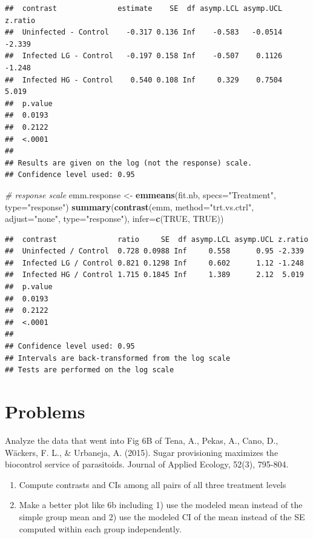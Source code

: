 \documentclass[]{book}
\newenvironment{Shaded}{\begin{snugshade}}{\end{snugshade}}
\newcommand{\KeywordTok}[1]{\textcolor[rgb]{0.13,0.29,0.53}{\textbf{#1}}}
\newcommand{\DataTypeTok}[1]{\textcolor[rgb]{0.13,0.29,0.53}{#1}}
\newcommand{\StringTok}[1]{\textcolor[rgb]{0.31,0.60,0.02}{#1}}
\newcommand{\CommentTok}[1]{\textcolor[rgb]{0.56,0.35,0.01}{\textit{#1}}}
\newcommand{\OtherTok}[1]{\textcolor[rgb]{0.56,0.35,0.01}{#1}}
\newcommand{\NormalTok}[1]{#1}
\providecommand{\tightlist}{%
  \setlength{\itemsep}{0pt}\setlength{\parskip}{0pt}}
\begin{document}
\begin{verbatim}
##  contrast              estimate    SE  df asymp.LCL asymp.UCL z.ratio
##  Uninfected - Control    -0.317 0.136 Inf    -0.583   -0.0514 -2.339 
##  Infected LG - Control   -0.197 0.158 Inf    -0.507    0.1126 -1.248 
##  Infected HG - Control    0.540 0.108 Inf     0.329    0.7504  5.019 
##  p.value
##  0.0193 
##  0.2122 
##  <.0001 
## 
## Results are given on the log (not the response) scale. 
## Confidence level used: 0.95
\end{verbatim}

\begin{Shaded}
\begin{Highlighting}[]
\CommentTok{# response scale}
\NormalTok{emm.response <-}\StringTok{ }\KeywordTok{emmeans}\NormalTok{(fit.nb, }\DataTypeTok{specs=}\StringTok{"Treatment"}\NormalTok{, }\DataTypeTok{type=}\StringTok{"response"}\NormalTok{)}
\KeywordTok{summary}\NormalTok{(}\KeywordTok{contrast}\NormalTok{(emm, }\DataTypeTok{method=}\StringTok{"trt.vs.ctrl"}\NormalTok{, }\DataTypeTok{adjust=}\StringTok{"none"}\NormalTok{, }\DataTypeTok{type=}\StringTok{"response"}\NormalTok{), }\DataTypeTok{infer=}\KeywordTok{c}\NormalTok{(}\OtherTok{TRUE}\NormalTok{, }\OtherTok{TRUE}\NormalTok{))}
\end{Highlighting}
\end{Shaded}

\begin{verbatim}
##  contrast              ratio     SE  df asymp.LCL asymp.UCL z.ratio
##  Uninfected / Control  0.728 0.0988 Inf     0.558      0.95 -2.339 
##  Infected LG / Control 0.821 0.1298 Inf     0.602      1.12 -1.248 
##  Infected HG / Control 1.715 0.1845 Inf     1.389      2.12  5.019 
##  p.value
##  0.0193 
##  0.2122 
##  <.0001 
## 
## Confidence level used: 0.95 
## Intervals are back-transformed from the log scale 
## Tests are performed on the log scale
\end{verbatim}

\section{Problems}\label{problems-4}

Analyze the data that went into Fig 6B of Tena, A., Pekas, A., Cano, D.,
Wäckers, F. L., \& Urbaneja, A. (2015). Sugar provisioning maximizes the
biocontrol service of parasitoids. Journal of Applied Ecology, 52(3),
795-804.

\begin{enumerate}
\def\labelenumi{\arabic{enumi}.}
\tightlist
\item
  Compute contrasts and CIs among all pairs of all three treatment
  levels
\item
  Make a better plot like 6b including 1) use the modeled mean instead
  of the simple group mean and 2) use the modeled CI of the mean instead
  of the SE computed within each group independently.
\end{enumerate}
\end{document}

